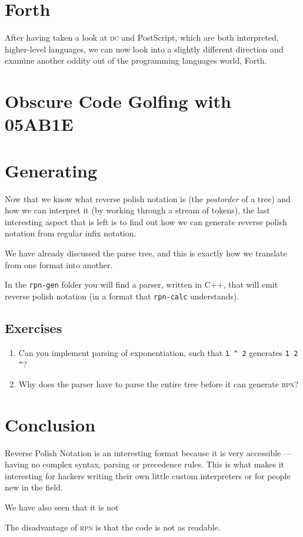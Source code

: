 \documentclass[a4paper,twocolumn]{article}
\begin{document}
\section{Forth}

After having taken a look at \textsc{dc} and PostScript, which are both interpreted, higher-level languages, we can now look into a slightly different direction and examine another oddity out of the programming languages world, Forth. 

\section{Obscure Code Golfing with 05AB1E}



\section{Generating}

Now that we know what reverse polish notation is (the \emph{postorder} of a tree) and how we can interpret it (by working through a stream of tokens), the last interesting aspect that is left is to find out how we can generate reverse polish notation from regular infix notation. 

We have already discussed the parse tree, and this is exactly how we translate from one format into another.

In the \verb|rpn-gen| folder you will find a parser, written in C++, that will emit reverse polish notation (in a format that \verb|rpn-calc| understands). 

\subsection*{Exercises}

\begin{enumerate}
  \item Can you implement parsing of exponentiation, such that \verb|1 ^ 2| generates \verb|1 2 ^|?
  \item Why does the parser have to parse the entire tree before it can generate \textsc{rpn}?
\end{enumerate}

\section{Conclusion}

Reverse Polish Notation is an interesting format because it is very accessible — having no complex syntax, parsing or precedence rules. This is what makes it interesting for hackers writing their own little custom interpreters or for people new in the field.

We have also seen that it is not 

The disadvantage of \textsc{rpn} is that the code is not as readable.

\printbibliography
\end{document}
